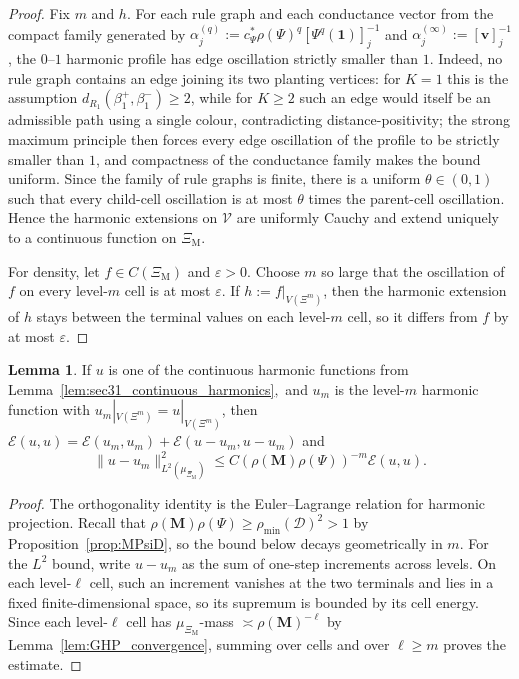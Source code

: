 \documentclass{article}
\theoremstyle{plain}
\theoremstyle{definition}
\newtheorem{lemma}[theorem]{Lemma}
\begin{document}
\begin{proof}
Fix $m$ and $h$.
For each rule graph and each conductance vector from the compact family generated by $\alpha_j^{(q)}:=c_\Psi^*\rho(\Psi)^q[\Psi^q(\mathbf 1)]_j^{-1}$ and $\alpha_j^{(\infty)}:=[\mathbf v]_j^{-1}$, the $0$--$1$ harmonic profile has edge oscillation strictly smaller than $1$.
Indeed, no rule graph contains an edge joining its two planting vertices: for $K=1$ this is the assumption $d_{R_1}(\beta_1^+,\beta_1^-)\ge 2$, while for $K\ge 2$ such an edge would itself be an admissible path using a single colour, contradicting distance-positivity; the strong maximum principle then forces every edge oscillation of the profile to be strictly smaller than $1$, and compactness of the conductance family makes the bound uniform.
Since the family of rule graphs is finite, there is a uniform $\theta\in(0,1)$ such that every child-cell oscillation is at most $\theta$ times the parent-cell oscillation.
Hence the harmonic extensions on $\mathscr V$ are uniformly Cauchy and extend uniquely to a continuous function on $\Xi_{\mathrm M}$.

For density, let $f\in C(\Xi_{\mathrm M})$ and $\varepsilon>0$.
Choose $m$ so large that the oscillation of $f$ on every level-$m$ cell is at most $\varepsilon$.
If $h:=f|_{V(\Xi^m)}$, then the harmonic extension of $h$ stays between the terminal values on each level-$m$ cell, so it differs from $f$ by at most $\varepsilon$.
\end{proof}

\begin{lemma}\label{lem:sec31_projection_tail_continuous}
If $u$ is one of the continuous harmonic functions from Lemma~\ref{lem:sec31_continuous_harmonics}$,$ and $u_m$ is the level-$m$ harmonic function with $u_m|_{V(\Xi^m)}=u|_{V(\Xi^m)}$, then $\mathcal E(u,u)=\mathcal E(u_m,u_m)+\mathcal E(u-u_m,u-u_m)$ and
\[
\|u-u_m\|_{L^2(\mu_{\Xi_{\mathrm M}})}^2
\le
C(\rho(\mathbf M)\rho(\Psi))^{-m}\mathcal E(u,u).
\]
\end{lemma}

\begin{proof}
The orthogonality identity is the Euler--Lagrange relation for harmonic projection.
Recall that $\rho(\mathbf M)\rho(\Psi)\ge\rho_{\min}(\mathcal D)^2>1$ by Proposition~\ref{prop:MPsiD}, so the bound below decays geometrically in $m$.
For the $L^2$ bound, write $u-u_m$ as the sum of one-step increments across levels.
On each level-$\ell$ cell, such an increment vanishes at the two terminals and lies in a fixed finite-dimensional space, so its supremum is bounded by its cell energy.
Since each level-$\ell$ cell has $\mu_{\Xi_{\mathrm M}}$-mass $\asymp \rho(\mathbf M)^{-\ell}$ by Lemma~\ref{lem:GHP_convergence}, summing over cells and over $\ell\ge m$ proves the estimate.
\end{proof}
\end{document}

